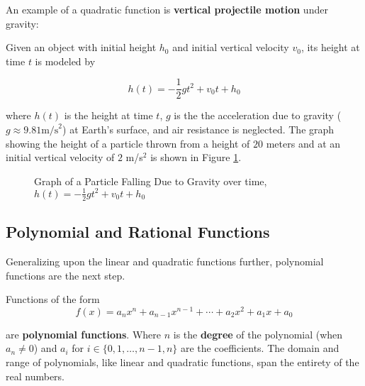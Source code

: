 \begin{example}
    An example of a quadratic function is \textbf{vertical projectile motion} under gravity:

    \noindent Given an object with initial height $h_0$ and initial vertical velocity $v_0$, its height at time $t$ is modeled by

    $$
    h(t) = -\frac{1}{2}gt^2 + v_0 t + h_0
    $$

    \noindent where $h(t)$ is the height at time $t$, $g$ is the the acceleration due to gravity ($g \approx 9.81 \text{m/s}^2$) at Earth's surface, and air resistance is neglected. The graph showing the height of a particle thrown from a height of $20$ meters and at an initial vertical velocity of $2$ m/s$^2$ is shown in Figure \ref{ballistictrajectory}.

    \begin{figure}[!ht]
        \centering
        \label{ballistictrajectory}
        \caption{Graph of a Particle Falling Due to Gravity over time, $h(t) = -\frac{1}{2}gt^2 + v_0 t + h_0$}
    \end{figure}
\end{example}

\subsection{Polynomial and Rational Functions}
Generalizing upon the linear and quadratic functions further, polynomial functions are the next step.

\begin{definition}
    Functions of the form
    \begin{equation}
        f(x) = a_n x^n + a_{n-1} x^{n-1} + \cdots + a_2 x^2 + a_1 x + a_0
    \end{equation}

    \noindent are \textbf{polynomial functions}. Where $n$ is the \textbf{degree} of the polynomial (when $a_n \neq 0$) and $a_i$ for $i \in \{0,1,\dots,n-1,n\}$ are the coefficients. The domain and range of polynomials, like linear and quadratic functions, span the entirety of the real numbers.
\end{definition}

